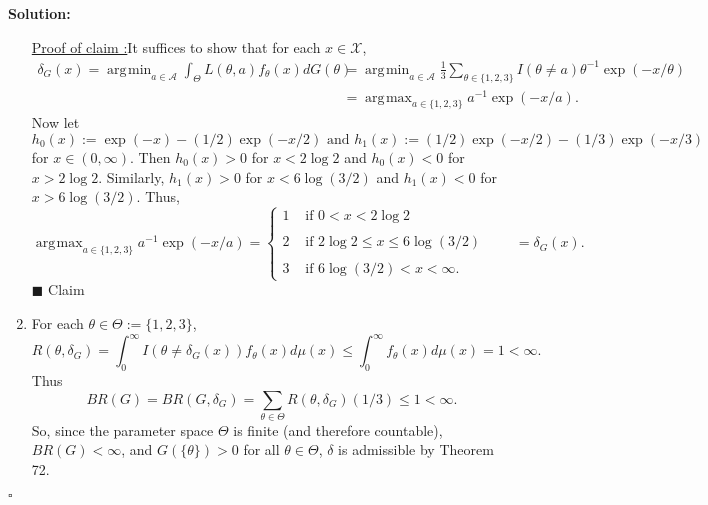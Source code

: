 \documentclass[12pt]{article}
\newcounter{ProofCounter}
\newcounter{ClaimCounter}[ProofCounter]
\newenvironment{Solution}{\stepcounter{ProofCounter}\textbf{Solution:}}{\hfill$\square$}
\newenvironment{claim}[1]{\vspace{1mm}\stepcounter{ClaimCounter}\par\noindent\underline{\bf Claim \theClaimCounter:}\space#1}{}
\newenvironment{claimproof}[1]{\par\noindent\underline{Proof of claim \theClaimCounter:}\space#1}{\hfill $\blacksquare$ Claim \theClaimCounter}
\DeclareMathOperator*{\argmin}{\arg\!\min}
\DeclareMathOperator*{\argmax}{\arg\!\max}
\begin{document}
\begin{Solution}
\begin{enumerate}[label=(\alph*),leftmargin=*]
      \begin{claimproof}
        It suffices to show that for each $x \in \mathcal{X}$, 
        \begin{align}
          \delta_{G}(x) = \argmin_{a \in \mathcal{A}} \int_{\Theta}L(\theta, a)f_{\theta}(x)dG(\theta) & = \argmin_{a \in\mathcal{A}} \frac{1}{3}
          \sum_{\theta \in \{1,2,3\}} I(\theta \neq a)\theta^{-1}\exp(-x/\theta) \nonumber \\
          & = \argmax_{a \in \{1,2,3\}} a^{-1}\exp(-x / a). \label{1.1}
        \end{align}
        Now let 
        \[ 
          h_0(x) := \exp(-x) - (1/2)\exp(-x/2) \text{ and } h_1(x) := (1/2)\exp(-x/2) - (1/3)\exp(-x/3)
        \]
        for $x \in (0,\infty)$.
        Then $h_0(x) > 0$ for $x < 2\log 2$ and $h_0(x) < 0$ for $x > 2\log 2$. Similarly, $h_1(x) > 0$ for $x < 6\log(3/2)$ and $h_1(x) < 0$ for $x >
        6\log(3/2)$. Thus,
        \[
          \argmax_{a \in \{1,2,3\}} a^{-1}\exp(-x / a) = \left\{ \begin{array}{ll} 
            1 & \text{ if } 0 < x < 2\log 2\\
            \\
            2 & \text{ if } 2\log 2 \leq x \leq 6\log(3 / 2) \\
            \\
            3 & \text{ if } 6\log(3/2) < x < \infty.
        \end{array} \right. \qquad = \delta_{G}(x).
      \]
      \end{claimproof}

    \item For each $\theta \in \Theta := \{1,2,3\}$, 
      \[
        R(\theta, \delta_{G}) = \int_{0}^{\infty}I(\theta \neq \delta_{G}(x))f_{\theta}(x)d\mu(x) \leq \int_{0}^{\infty}f_{\theta}(x)d\mu(x) = 1 < \infty.
      \]
      Thus 
      \[
        BR(G) = BR(G, \delta_{G}) = \sum_{\theta \in \Theta }R(\theta, \delta_{G})(1/3) \leq 1 < \infty.
      \]
      So, since the parameter space $\Theta$ is finite (and therefore countable), $BR(G) < \infty$, and $G(\{\theta\}) > 0$ for all 
      $\theta \in \Theta$, $\delta$ is admissible by Theorem 72.


\end{enumerate}
\end{Solution}
\end{document}
